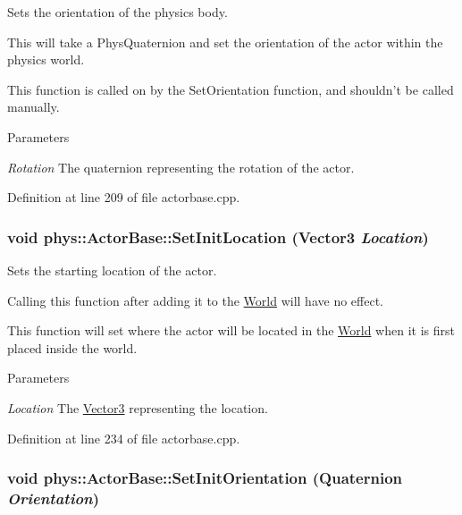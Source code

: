 Sets the orientation of the physics body. 

This will take a PhysQuaternion and set the orientation of the actor within the physics world. \par
 This function is called on by the SetOrientation function, and shouldn't be called manually. 
\begin{DoxyParams}{Parameters}
\item[{\em Rotation}]The quaternion representing the rotation of the actor. \end{DoxyParams}


Definition at line 209 of file actorbase.cpp.

\hypertarget{classphys_1_1ActorBase_a0ff0980bcf33a8205eb058b8caa1f36b}{
\subsubsection[{SetInitLocation}]{\setlength{\rightskip}{0pt plus 5cm}void phys::ActorBase::SetInitLocation ({\bf Vector3} {\em Location})}}
\label{d8/d0f/classphys_1_1ActorBase_a0ff0980bcf33a8205eb058b8caa1f36b}


Sets the starting location of the actor. 

Calling this function after adding it to the \hyperlink{classphys_1_1World}{World} will have no effect. \par
 This function will set where the actor will be located in the \hyperlink{classphys_1_1World}{World} when it is first placed inside the world. 
\begin{DoxyParams}{Parameters}
\item[{\em Location}]The \hyperlink{classphys_1_1Vector3}{Vector3} representing the location. \end{DoxyParams}


Definition at line 234 of file actorbase.cpp.

\hypertarget{classphys_1_1ActorBase_a681186465db767954ca3f9530a1d7c36}{
\subsubsection[{SetInitOrientation}]{\setlength{\rightskip}{0pt plus 5cm}void phys::ActorBase::SetInitOrientation ({\bf Quaternion} {\em Orientation})}}
\label{d8/d0f/classphys_1_1ActorBase_a681186465db767954ca3f9530a1d7c36}


